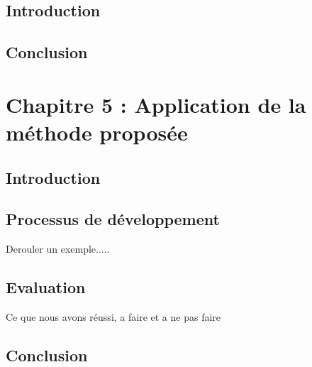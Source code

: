 \documentclass[
10pt, %
a4paper, %
oneside, %
headinclude,footinclude, %
BCOR5mm, %
]{report}
\begin{document}
		\section{Introduction}
		\lipsum[10] %
		\section{Conclusion}
		\lipsum[10]
										  
										  
										  
		\newpage
		\chapter{Chapitre 5 : Application de la méthode proposée  }
		\minitoc  
		\section{Introduction}
		\lipsum[10]
		\section{Processus de développement}
		Derouler un exemple.....
		\section{Evaluation}
		Ce que nous avons réussi, a faire et a ne pas faire
		\section{Conclusion}
		\lipsum[10]	
										  
										  
										  
\end{document}
